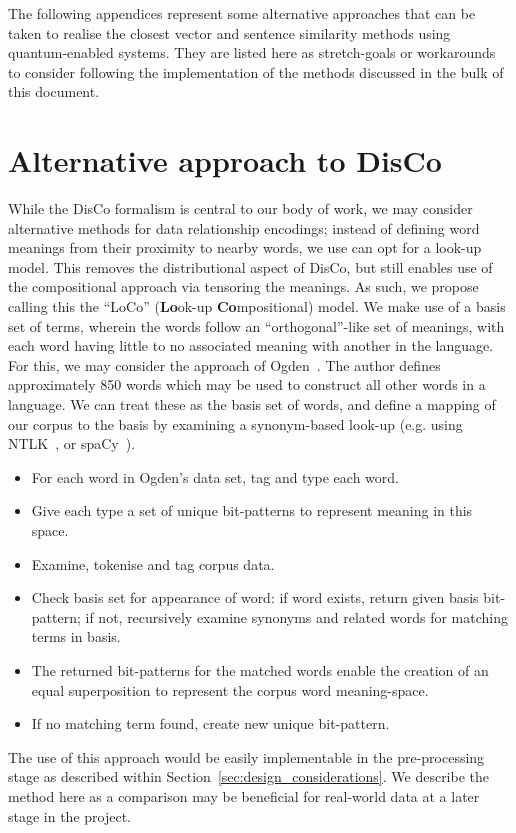 \begin{appendices}

The following appendices represent some alternative approaches that can be taken to realise the closest vector and sentence similarity methods using quantum-enabled systems. They are listed here as stretch-goals or workarounds to consider following the implementation of the methods discussed in the bulk of this document.

\section{Alternative approach to DisCo}\label{app:loco_algo}

While the DisCo formalism is central to our body of work, we may consider alternative methods for data relationship encodings; instead of defining word meanings from their proximity to nearby words, we use can opt for a look-up model. This removes the distributional aspect of DisCo, but still enables use of the compositional approach via tensoring the meanings. As such, we propose calling this the ``LoCo'' (\textbf{Lo}ok-up \textbf{Co}mpositional) model. We make use of a basis set of terms, wherein the words follow an ``orthogonal''-like set of meanings, with each word having little to no associated meaning with another in the language. For this, we may consider the approach of Ogden~\cite{OgdenC.K.CharlesKay1940BE:a}. The author defines approximately 850 words which may be used to construct all other words in a language. We can treat these as the basis set of words, and define a mapping of our corpus to the basis by examining a synonym-based look-up (e.g. using NTLK~\cite{BirdKleinLoper09}, or spaCy~\cite{spacy2}). 
\begin{itemize}
    \item For each word in Ogden's data set, tag and type each word.
    \item Give each type a set of unique bit-patterns to represent meaning in this space.
    \item Examine, tokenise and tag corpus data.
    \item Check basis set for appearance of word: if word exists, return given basis bit-pattern; if not, recursively examine synonyms and related words for matching terms in basis.
    \item The returned bit-patterns for the matched words enable the creation of an equal superposition to represent the corpus word meaning-space.
    \item If no matching term found, create new unique bit-pattern.
\end{itemize}
The use of this approach would be easily implementable in the pre-processing stage as described within Section~\ref{sec:design_considerations}. We describe the method here as a comparison may be beneficial for real-world data at a later stage in the project.


\end{appendices}
